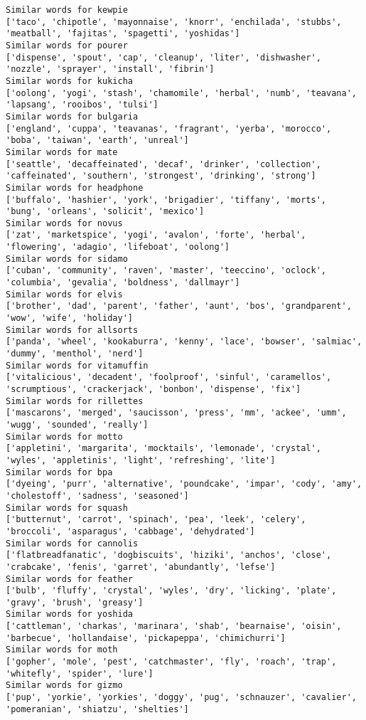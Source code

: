 \documentclass[11pt]{article}
\begin{document}
\begin{Verbatim}[commandchars=\\\{\}]
Similar words for kewpie
['taco', 'chipotle', 'mayonnaise', 'knorr', 'enchilada', 'stubbs', 'meatball', 'fajitas', 'spagetti', 'yoshidas']
Similar words for pourer
['dispense', 'spout', 'cap', 'cleanup', 'liter', 'dishwasher', 'nozzle', 'sprayer', 'install', 'fibrin']
Similar words for kukicha
['oolong', 'yogi', 'stash', 'chamomile', 'herbal', 'numb', 'teavana', 'lapsang', 'rooibos', 'tulsi']
Similar words for bulgaria
['england', 'cuppa', 'teavanas', 'fragrant', 'yerba', 'morocco', 'boba', 'taiwan', 'earth', 'unreal']
Similar words for mate
['seattle', 'decaffeinated', 'decaf', 'drinker', 'collection', 'caffeinated', 'southern', 'strongest', 'drinking', 'strong']
Similar words for headphone
['buffalo', 'hashier', 'york', 'brigadier', 'tiffany', 'morts', 'bung', 'orleans', 'solicit', 'mexico']
Similar words for novus
['zat', 'marketspice', 'yogi', 'avalon', 'forte', 'herbal', 'flowering', 'adagio', 'lifeboat', 'oolong']
Similar words for sidamo
['cuban', 'community', 'raven', 'master', 'teeccino', 'oclock', 'columbia', 'gevalia', 'boldness', 'dallmayr']
Similar words for elvis
['brother', 'dad', 'parent', 'father', 'aunt', 'bos', 'grandparent', 'wow', 'wife', 'holiday']
Similar words for allsorts
['panda', 'wheel', 'kookaburra', 'kenny', 'lace', 'bowser', 'salmiac', 'dummy', 'menthol', 'nerd']
Similar words for vitamuffin
['vitalicious', 'decadent', 'foolproof', 'sinful', 'caramellos', 'scrumptious', 'crackerjack', 'bonbon', 'dispense', 'fix']
Similar words for rillettes
['mascarons', 'merged', 'saucisson', 'press', 'mm', 'ackee', 'umm', 'wugg', 'sounded', 'really']
Similar words for motto
['appletini', 'margarita', 'mocktails', 'lemonade', 'crystal', 'wyles', 'appletinis', 'light', 'refreshing', 'lite']
Similar words for bpa
['dyeing', 'purr', 'alternative', 'poundcake', 'impar', 'cody', 'amy', 'cholestoff', 'sadness', 'seasoned']
Similar words for squash
['butternut', 'carrot', 'spinach', 'pea', 'leek', 'celery', 'broccoli', 'asparagus', 'cabbage', 'dehydrated']
Similar words for cannolis
['flatbreadfanatic', 'dogbiscuits', 'hiziki', 'anchos', 'close', 'crabcake', 'fenis', 'garret', 'abundantly', 'lefse']
Similar words for feather
['bulb', 'fluffy', 'crystal', 'wyles', 'dry', 'licking', 'plate', 'gravy', 'brush', 'greasy']
Similar words for yoshida
['cattleman', 'charkas', 'marinara', 'shab', 'bearnaise', 'oisin', 'barbecue', 'hollandaise', 'pickapeppa', 'chimichurri']
Similar words for moth
['gopher', 'mole', 'pest', 'catchmaster', 'fly', 'roach', 'trap', 'whitefly', 'spider', 'lure']
Similar words for gizmo
['pup', 'yorkie', 'yorkies', 'doggy', 'pug', 'schnauzer', 'cavalier', 'pomeranian', 'shiatzu', 'shelties']

\end{Verbatim}
\end{document}
